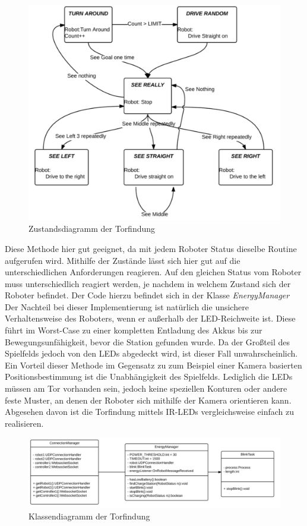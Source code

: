\begin{figure}[!h]
	\includegraphics[width=\textwidth]{images/state_diagramm_findgoal.pdf}
	\caption{Zustandsdiagramm der Torfindung}
	\label{fig:state_findgoal}
\end{figure}

Diese Methode hier gut geeignet, da mit jedem Roboter Status dieselbe Routine aufgerufen wird. Mithilfe der Zustände lässt sich hier gut auf die unterschiedlichen Anforderungen reagieren. Auf den gleichen Status vom Roboter muss unterschiedlich reagiert werden, je nachdem in welchem Zustand sich der Roboter befindet. Der Code hierzu befindet sich in der Klasse \textit{EnergyManager}\\
Der Nachteil bei dieser Implementierung ist natürlich die unsichere Verhaltensweise des Roboters, wenn er außerhalb der LED-Reichweite ist. Diese führt im Worst-Case zu einer kompletten Entladung des Akkus bis zur Bewegungsunfähigkeit, bevor die Station gefunden wurde. Da der Großteil des Spielfelds jedoch von den LEDs abgedeckt wird, ist dieser Fall unwahrscheinlich. Ein Vorteil dieser Methode im Gegensatz zu zum Beispiel einer Kamera basierten Positionsbestimmung ist die Unabhängigkeit des Spielfelds. Lediglich die LEDs müssen am Tor vorhanden sein, jedoch keine speziellen Konturen oder andere feste Muster, an denen der Roboter sich mithilfe der Kamera orientieren kann. Abgesehen davon ist die Torfindung mittels IR-LEDs vergleichsweise einfach zu realisieren.

\begin{figure}[!h]
	\includegraphics[width=\textwidth]{images/uml_energymanager.pdf}
	\caption{Klassendiagramm der Torfindung}
	\label{fig:uml_energymanager}
\end{figure}




